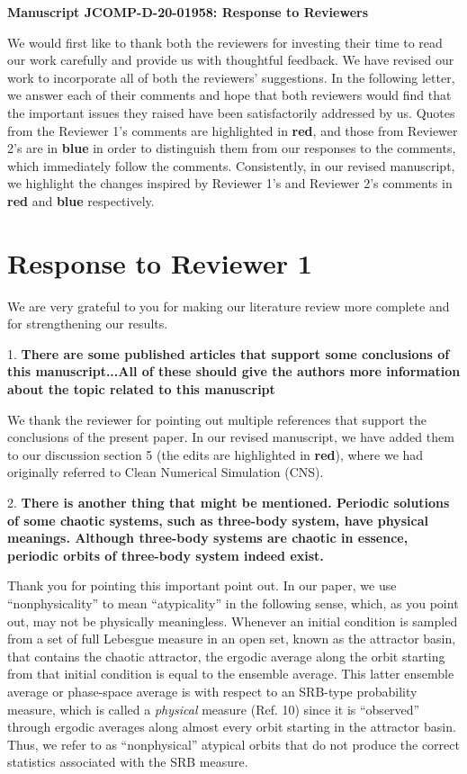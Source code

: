\documentclass[11pt]{article}
\title{}
\author{}
\date{30th October 2020}
\newcommand{\reviewerOne}[1]{{\color{burgundy}\textbf{#1}}}
\newcommand{\reviewerTwo}[1]{{\color{azure}\textbf{#1}}}
\begin{document}
\begin{center}
		\Large{\textbf{Manuscript JCOMP-D-20-01958: Response to Reviewers}}
\end{center}
\medskip
We would first like to thank both the reviewers for investing their time to read our work carefully and provide us with thoughtful feedback. We have revised our work to incorporate all of both the reviewers' suggestions. In the following letter, we answer each of their comments and hope that both reviewers would find that the 
important issues they raised have been satisfactorily addressed by us.
Quotes from the Reviewer 1's comments are highlighted in \reviewerOne{red}, and those from Reviewer 2's are in \reviewerTwo{blue} in order to distinguish them from our responses to the comments, which immediately follow the comments. Consistently, in our revised manuscript, we highlight the changes inspired by Reviewer 1's and Reviewer 2's comments in \reviewerOne{red} and \reviewerTwo{blue} respectively.
\section{Response to Reviewer 1}
We are very grateful to you for making our literature review more complete and for strengthening our results.

1. \reviewerOne{There are some published articles that support some conclusions of this manuscript...All of these should give the authors more information about the topic related to this manuscript}

We thank the reviewer for pointing out multiple references that support the conclusions of the present paper. In our revised manuscript, we have added them to our discussion section 5 (the edits are highlighted in \reviewerOne{red}), where we had originally referred to Clean Numerical Simulation (CNS).


2. \reviewerOne{There is another thing that might be mentioned.  Periodic solutions of some chaotic systems, such as three-body system, have physical meanings.  Although three-body systems are chaotic in essence, periodic orbits of three-body system indeed exist.}

Thank you for pointing this important point out. In our paper, we use ``nonphysicality'' to mean ``atypicality'' in the following sense, which, as you point out, may not be physically meaningless. Whenever an initial condition is sampled from a set of full Lebesgue measure in an open set, known as the attractor basin, that contains the chaotic attractor, the ergodic average along the orbit starting from that initial condition is equal to the ensemble average. This latter ensemble average or phase-space average is with respect to an SRB-type probability measure, which is called a {\em physical} measure (Ref. 10) since it is ``observed'' through ergodic averages along almost every orbit starting in the attractor basin. Thus, we refer to as ``nonphysical'' atypical orbits that do not produce the correct statistics associated with the SRB measure. 
\end{document}
